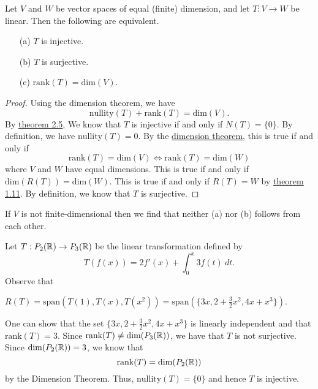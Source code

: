 \begin{theorem}\label{Theorem 2.5}
    Let \( V  \) and \( W  \) be vector spaces of equal (finite) dimension, and let \( T : V \to W  \) be linear. Then the following are equivalent.
    \begin{enumerate}
        \item[(a)] \( T  \) is injective.
        \item[(b)] \( T \) is surjective.
        \item[(c)] \( \text{rank}(T) = \text{dim}(V) \).
    \end{enumerate}
\end{theorem}

\begin{proof}
    Using the dimension theorem, we have
    \[ \text{nullity}(T) + \text{rank}(T) = \text{dim}(V).  \]
    By {\hyperref[Theorem 2.5]{theorem 2.5}}, We know that \( T  \) is injective if and only if \( N(T) = \{ 0  \}  \). By definition, we have  \( \text{nullity}(T) = 0  \). By the {\hyperref[Dimension Theorem]{dimension theorem}}, this is true if and only if 
    \[ \text{rank}(T) = \text{dim}(V) \iff \text{rank}(T) = \text{dim}(W) \]
    where \( V  \) and \( W  \) have equal dimensions.
    This is true if and only if \( \text{dim}(R(T)) = \text{dim}(W ) \). This is true if and only if \( R(T) = W  \) by {\hyperref[Theorem 1.11]{theorem 1.11}}. By definition, we know that \( T \) is surjective. 
\end{proof}

\begin{remark}
    If \( V  \) is not finite-dimensional then we find that neither (a) nor (b) follows from each other.
\end{remark}

\begin{eg}
    Let \( T: P_{2}(\mathbb{R}) \to P_{3}(\mathbb{R})  \) be the linear transformation defined by 
    \[  T(f(x)) = 2 f'(x) + \int_{ 0 }^{ x }  3f(t)  \ dt. \]
    Observe that
    \begin{center}
        \( R(T) = \text{span}(T(1), T(x), T(x^{2})) = \text{span}(\{ 3x, 2 + \frac{ 3 }{ 2 } x^{2} , 4x + x^{3} \} ). \)
    \end{center}
    One can show that the set \( \{ 3x, 2 + \frac{ 3 }{ 2 } x^{2} , 4x + x^{3} \}  \) is linearly independent and that \( \text{rank}(T) = 3  \). Since \( \text{rank}(T) \neq \text{dim}(P_{3}(\mathbb{R})) \), we have that \( T  \) is not surjective. Since \( \text{dim}(P_{2}(\mathbb{R})) = 3  \), we know that
    \[   \text{rank}(T) = \text{dim}(P_{2}(\mathbb{R})) \]
    by the Dimension Theorem. Thus, \( \text{nullity}(T) = \{ 0 \}  \) and hence \( T  \) is injective.
\end{eg}

